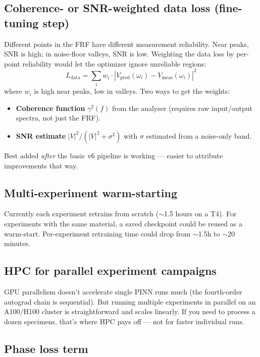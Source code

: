 \documentclass[11pt,a4paper]{article}
\begin{document}
\subsection{Coherence- or SNR-weighted data loss (fine-tuning step)}

Different points in the FRF have different measurement reliability. Near peaks, SNR is high; in noise-floor valleys, SNR is low. Weighting the data loss by per-point reliability would let the optimizer ignore unreliable regions:
\begin{equation}
L_\text{data} = \sum_i w_i \cdot |V_\text{pred}(\omega_i) - V_\text{meas}(\omega_i)|^2
\end{equation}
where $w_i$ is high near peaks, low in valleys. Two ways to get the weights:
\begin{itemize}[leftmargin=*, itemsep=2pt]
\item \textbf{Coherence function} $\gamma^2(f)$ from the analyser (requires raw input/output spectra, not just the FRF).
\item \textbf{SNR estimate} $|V|^2 / (|V|^2 + \sigma^2)$ with $\sigma$ estimated from a noise-only band.
\end{itemize}
Best added \emph{after} the basic v6 pipeline is working --- easier to attribute improvements that way.

\subsection{Multi-experiment warm-starting}

Currently each experiment retrains from scratch ($\sim$1.5 hours on a T4). For experiments with the same material, a saved checkpoint could be reused as a warm-start. Per-experiment retraining time could drop from $\sim$1.5h to $\sim$20 minutes.

\subsection{HPC for parallel experiment campaigns}

GPU parallelism doesn't accelerate single PINN runs much (the fourth-order autograd chain is sequential). But running multiple experiments in parallel on an A100/H100 cluster is straightforward and scales linearly. If you need to process a dozen specimens, that's where HPC pays off --- not for faster individual runs.

\subsection{Phase loss term}
\end{document}
